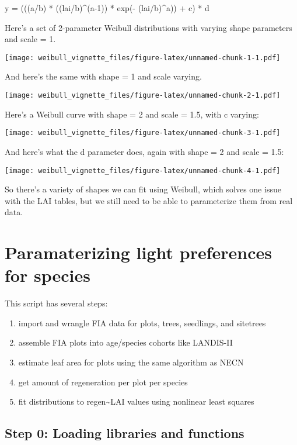 \documentclass[
]{article}
\providecommand{\tightlist}{%
  \setlength{\itemsep}{0pt}\setlength{\parskip}{0pt}}
\begin{document}
y = (((a/b) * ((lai/b)\^{}(a-1)) * exp(- (lai/b)\^{}a)) + c) * d

Here's a set of 2-parameter Weibull distributions with varying shape
parameters and scale = 1.

\texttt{[image: weibull\_vignette\_files/figure-latex/unnamed-chunk-1-1.pdf]}

And here's the same with shape = 1 and scale varying.

\texttt{[image: weibull\_vignette\_files/figure-latex/unnamed-chunk-2-1.pdf]}

Here's a Weibull curve with shape = 2 and scale = 1.5, with c varying:

\texttt{[image: weibull\_vignette\_files/figure-latex/unnamed-chunk-3-1.pdf]}

And here's what the d parameter does, again with shape = 2 and scale =
1.5:

\texttt{[image: weibull\_vignette\_files/figure-latex/unnamed-chunk-4-1.pdf]}

So there's a variety of shapes we can fit using Weibull, which solves
one issue with the LAI tables, but we still need to be able to
parameterize them from real data.

\section{Paramaterizing light preferences for
species}\label{paramaterizing-light-preferences-for-species}

This script has several steps:

\begin{enumerate}
\def\labelenumi{\arabic{enumi}.}
\tightlist
\item
  import and wrangle FIA data for plots, trees, seedlings, and sitetrees
\item
  assemble FIA plots into age/species cohorts like LANDIS-II
\item
  estimate leaf area for plots using the same algorithm as NECN
\item
  get amount of regeneration per plot per species
\item
  fit distributions to regen\textasciitilde LAI values using nonlinear
  least squares
\end{enumerate}

\subsection{Step 0: Loading libraries and
functions}\label{step-0-loading-libraries-and-functions}
\end{document}
